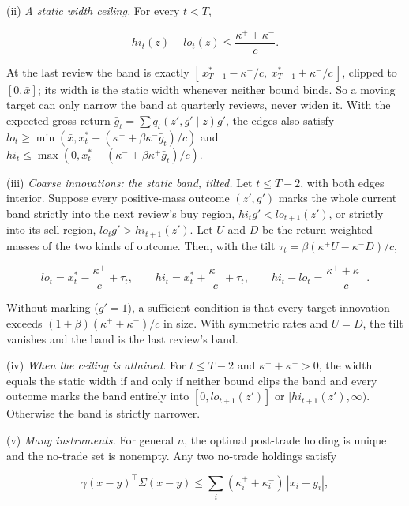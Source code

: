\documentclass[11pt]{article}
\begin{document}
(ii) \emph{A static width ceiling.} For every \(t<T\),

\begin{equation*}
hi_t(z)-lo_t(z)\leq\frac{\kappa^++\kappa^-}{c}.\tag{80}\label{eq:80}
\end{equation*}

At the last review the band is exactly
\([\,x^*_{T-1}-\kappa^+/c,\ x^*_{T-1}+\kappa^-/c\,]\), clipped to
\([0,\bar x]\); its width is the static width whenever neither bound
binds. So a moving target can only narrow the band at quarterly
reviews, never widen it. With the expected gross return
\(\bar g_t=\sum q_t(z',g'\mid z)g'\), the edges also satisfy
\(lo_t\geq\min(\bar x,x^*_t-(\kappa^++\beta\kappa^-\bar g_t)/c)\) and
\(hi_t\leq\max(0,x^*_t+(\kappa^-+\beta\kappa^+\bar g_t)/c)\).

(iii) \emph{Coarse innovations: the static band, tilted.} Let
\(t\leq T-2\), with both edges interior. Suppose every positive-mass
outcome \((z',g')\) marks the whole current band strictly into the next
review's buy region, \(hi_t g'<lo_{t+1}(z')\), or strictly into its
sell region, \(lo_t g'>hi_{t+1}(z')\). Let \(U\) and \(D\) be the
return-weighted masses of the two kinds of outcome. Then, with the
tilt \(\tau_t=\beta(\kappa^+U-\kappa^-D)/c\),

\begin{equation*}
lo_t=x^*_t-\frac{\kappa^+}c+\tau_t,\qquad
hi_t=x^*_t+\frac{\kappa^-}c+\tau_t,\qquad
hi_t-lo_t=\frac{\kappa^++\kappa^-}c.\tag{81}\label{eq:81}
\end{equation*}

Without marking (\(g'=1\)), a sufficient condition is that every
target innovation exceeds \((1+\beta)(\kappa^++\kappa^-)/c\) in size. With
symmetric rates and \(U=D\), the tilt vanishes and the band is the
last review's band.

(iv) \emph{When the ceiling is attained.} For \(t\leq T-2\) and
\(\kappa^++\kappa^->0\), the width equals the static width if and only if
neither bound clips the band and every outcome marks the band
entirely into \([0,lo_{t+1}(z')]\) or \([hi_{t+1}(z'),\infty)\). Otherwise
the band is strictly narrower.

(v) \emph{Many instruments.} For general \(n\), the optimal post-trade
holding is unique and the no-trade set is nonempty. Any two no-trade
holdings satisfy

\begin{equation*}
\gamma(x-y)^\top\Sigma(x-y)\leq\sum_i(\kappa^+_i+\kappa^-_i)\,|x_i-y_i|,\tag{82}\label{eq:82}
\end{equation*}
\end{document}

